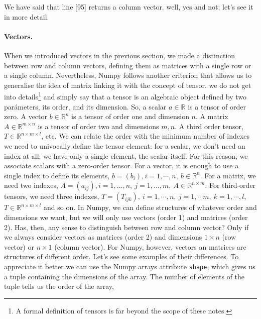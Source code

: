 \begin{paracol}{2}
We have said that line [95] returns a column vector. well, yes and not; let's see it in more detail.

\paragraph{Vectors.} When we introduced vectors in the previous section, we made a distinction between row and column vectors, defining them as matrices with a single row or a single column. Nevertheless, Numpy follows another criterion that allows us to generalise the idea of matrix linking it with the concept of tensor. we do not get into details\footnote{A formal definition of tensors is far beyond the scope of these notes.} and simply say that a tensor is an algebraic object defined by two parámeters, its order, and its dimension. So, a scalar $a \in \mathbb{R}$ is a tensor of order zero. A vector $b \in \mathbb{R}^n$ is a tensor of order one and dimension $n$. A matrix $A\in \mathbb{R}^{m\times n}$ is a tensor of order two and dimensions $m,n$. A third order tensor, $T\in\mathbb{R}^{n\times m\times l}$, etc. We can relate the order with the minimum number of indexes we need to univocally define the tensor element: for a scalar, we don't need an index at all; we have only a single element, the scalar itself. For this reason, we associate scalars with a zero-order tensor. For a vector, it is enough to use a single index to define its elements, $b=(b_i), i = 1,\cdots, n,\ b \in \mathbb{R}^n$. For a matrix, we need two indexes, $A = (a_{ij}), i =1,\dots,n,\ j = 1,\dots,m,\ A \in \mathbb{R}^{n\times m}$. For third-order tensors, we need three indexes, $T=(T_{ijk}),\ i =1,\cdots, n,\ j =1,\cdots m,\ k = 1,\cdots, l$, $T\in \mathbb{R}^{n\times m \times l}$ and so on. In Numpy, we can define structures of whatever order and dimensions we want, but we will only use vectors (order 1) and matrices (order 2). Has, then, any sense to distinguish between row and column vector? Only if we always consider vectors as matrices (order 2) and dimensions $1\times n$ (row vector) or $n\times 1$ (column vector). For Numpy, however, vectors an matrices are structures of different order. Let's see some examples of their differences. To appreciate it better we can use the Numpy arrays attribute \texttt{shape}, which gives us a tuple containing the dimensions of the array. The number of elements of the tuple tells us the order of the array,     
\end{paracol}
